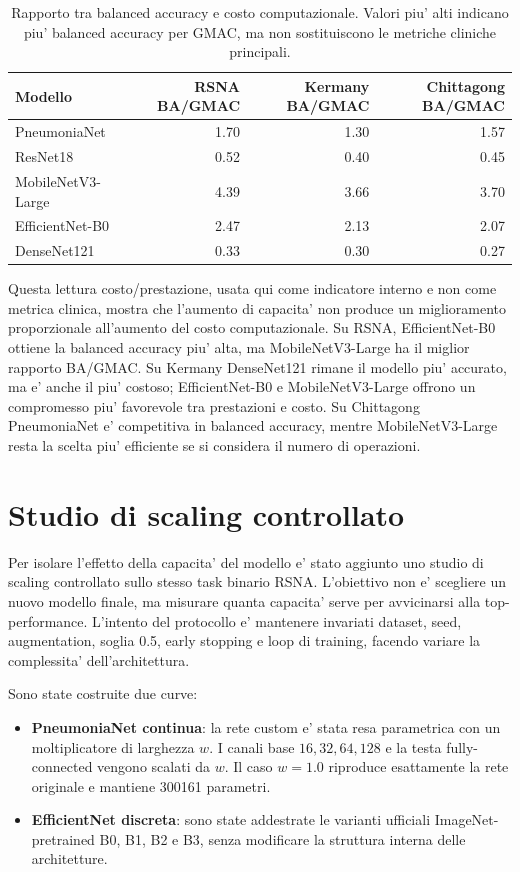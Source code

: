 \documentclass[11pt,a4paper]{article}
\newcommand{\balacc}{balanced accuracy}
\begin{document}
\begin{table}[H]
\centering
\caption{Rapporto tra \balacc{} e costo computazionale. Valori piu' alti indicano piu' \balacc{} per GMAC, ma non sostituiscono le metriche cliniche principali.}
\begin{tabular}{lrrr}
\toprule
Modello & RSNA BA/GMAC & Kermany BA/GMAC & Chittagong BA/GMAC \\
\midrule
PneumoniaNet & 1.70 & 1.30 & 1.57 \\
ResNet18 & 0.52 & 0.40 & 0.45 \\
MobileNetV3-Large & 4.39 & 3.66 & 3.70 \\
EfficientNet-B0 & 2.47 & 2.13 & 2.07 \\
DenseNet121 & 0.33 & 0.30 & 0.27 \\
\bottomrule
\end{tabular}
\end{table}

Questa lettura costo/prestazione, usata qui come indicatore interno e non come
metrica clinica, mostra che l'aumento di capacita' non produce
un miglioramento proporzionale all'aumento del costo computazionale. Su RSNA,
EfficientNet-B0 ottiene la \balacc{} piu' alta, ma MobileNetV3-Large ha il
miglior rapporto BA/GMAC. Su Kermany DenseNet121 rimane il modello piu'
accurato, ma e' anche il piu' costoso; EfficientNet-B0 e MobileNetV3-Large
offrono un compromesso piu' favorevole tra prestazioni e costo. Su Chittagong
PneumoniaNet e' competitiva in \balacc{}, mentre MobileNetV3-Large resta la
scelta piu' efficiente se si considera il numero di operazioni.

\section{Studio di scaling controllato}

Per isolare l'effetto della capacita' del modello e' stato aggiunto uno studio
di scaling controllato sullo stesso task binario RSNA. L'obiettivo non e'
scegliere un nuovo modello finale, ma misurare quanta capacita' serve per
avvicinarsi alla top-performance. L'intento del protocollo e' mantenere invariati
dataset, seed, augmentation, soglia 0.5, early stopping e loop di training,
facendo variare la complessita' dell'architettura.

Sono state costruite due curve:

\begin{itemize}
  \item \textbf{PneumoniaNet continua}: la rete custom e' stata resa parametrica
  con un moltiplicatore di larghezza \(w\). I canali base
  \(16,32,64,128\) e la testa fully-connected vengono scalati da \(w\).
  Il caso \(w=1.0\) riproduce esattamente la rete originale e mantiene
  300161 parametri.
  \item \textbf{EfficientNet discreta}: sono state addestrate le varianti
  ufficiali ImageNet-pretrained B0, B1, B2 e B3, senza modificare la struttura
  interna delle architetture.
\end{itemize}
\end{document}
